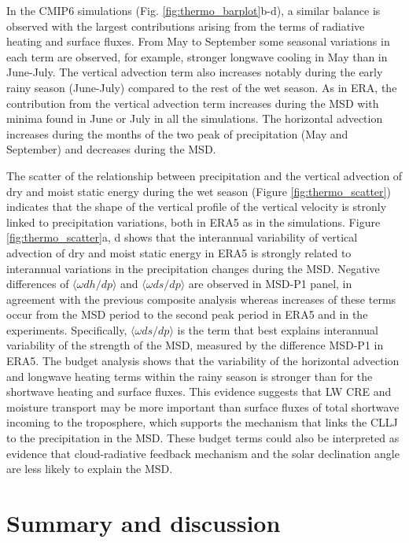 In the CMIP6 simulations (Fig. \ref{fig:thermo_barplot}b-d), a similar balance is observed with the largest contributions arising from the terms of radiative heating and surface fluxes. 
From May to September some seasonal variations in each term are observed, for example, stronger longwave cooling in May than in June-July. The vertical advection term also increases notably during the early rainy season (June-July) compared to the rest of the wet season. As in ERA, the contribution from the vertical advection term increases during the MSD with minima found in June or July in all the simulations. 
The horizontal advection increases during the months of the two peak of precipitation (May and September) and decreases during the MSD. 


The scatter of the relationship between precipitation and the vertical advection of dry and moist static energy during the wet season (Figure \ref{fig:thermo_scatter}) indicates that the shape of the vertical profile of the vertical velocity is stronly linked to precipitation variations, both in ERA5 as in the simulations. Figure \ref{fig:thermo_scatter}a, d shows that the interannual variability of vertical advection of dry and moist static energy in ERA5 is strongly related to interannual variations in the precipitation changes during the MSD. Negative differences of $\langle \omega dh/dp \rangle$ and $\langle \omega ds/dp \rangle$ are observed in MSD-P1 panel, in agreement with the previous composite analysis whereas increases of these terms occur from the MSD period to the second peak period in ERA5 and in the experiments. Specifically, $\langle \omega ds/dp \rangle$ is the term that best explains interannual variability of the strength of the MSD, measured by the difference MSD-P1 in ERA5. 
The budget analysis shows that the variability of the horizontal advection and longwave heating terms within the rainy season is stronger than for the shortwave heating and surface fluxes. 
This evidence suggests that LW CRE and moisture transport may be more important than surface fluxes of total shortwave incoming to the troposphere, which supports the mechanism that links the CLLJ to the precipitation in the MSD. These budget terms could also be interpreted as evidence that cloud-radiative feedback mechanism and the solar declination angle are less likely to explain the MSD.

\section{Summary and discussion}\label{sq:sumdiscuss}

